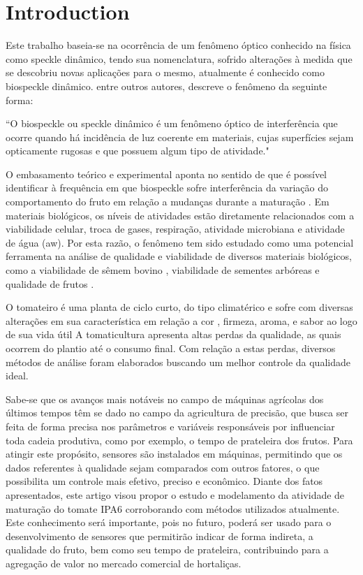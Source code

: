 \documentclass{elsarticle}
\begin{document}
\section{Introduction}

Este trabalho baseia-se na ocorrência de um fenômeno óptico conhecido na física como speckle dinâmico, tendo sua nomenclatura, sofrido alterações à medida que se descobriu novas aplicações para o mesmo, atualmente é conhecido como biospeckle dinâmico. \citet{Rodrigues2007} entre outros autores, descreve o fenômeno da seguinte forma:
\begin{citacao} %
“O biospeckle ou speckle dinâmico é um fenômeno óptico de interferência que ocorre quando há incidência de luz coerente em materiais, cujas superfícies sejam opticamente rugosas e que possuem algum tipo de atividade."
\end{citacao}

O embasamento teórico e experimental aponta no sentido de que é possível identificar à frequência em que biospeckle sofre interferência da variação do comportamento do fruto em relação a mudanças durante a maturação \cite{Zdunek2014}. Em materiais biológicos, os níveis de atividades estão diretamente relacionados com a viabilidade celular, troca de gases, respiração, atividade microbiana e atividade de água (aw). 
 Por esta razão, o fenômeno tem sido estudado como uma potencial ferramenta na análise de qualidade e viabilidade de diversos materiais biológicos, como a viabilidade de sêmem bovino \cite{Henrique2007a}, viabilidade de sementes arbóreas \citep{Aparecida2011} e qualidade de frutos \citep{Cotching2018}.

O tomateiro é uma planta de ciclo curto, do tipo climatérico e sofre com diversas alterações em sua característica em relação a cor \citep{santana2017infodengue}, firmeza, aroma, e sabor \citep{CarmeloLuisGustavoPaulino;FerreiraMarcosDavid;GimenezCalbo2015} ao logo de sua vida útil 
A tomaticultura apresenta altas perdas da qualidade, as quais ocorrem do plantio até o consumo final. Com relação a estas perdas, diversos métodos de análise foram elaborados buscando um melhor controle da qualidade ideal. 

Sabe-se que os avanços mais notáveis no campo de máquinas agrícolas dos últimos tempos têm se dado no campo da agricultura de precisão, que busca ser feita de forma precisa nos parâmetros e variáveis responsáveis por influenciar toda cadeia produtiva, como por exemplo, o tempo de prateleira dos frutos. Para atingir este propósito, sensores são instalados em máquinas, permitindo que os dados referentes à qualidade sejam comparados com outros fatores, o que possibilita um controle mais efetivo, preciso e econômico.
Diante dos fatos apresentados, este artigo visou propor o estudo e modelamento da atividade de maturação do tomate IPA6 corroborando com métodos utilizados atualmente. Este conhecimento será importante, pois no futuro, poderá ser usado para o desenvolvimento de sensores que permitirão indicar de forma indireta, a qualidade do fruto, bem como seu tempo de prateleira, contribuindo para a agregação de valor no mercado comercial de hortaliças. 
\end{document}
